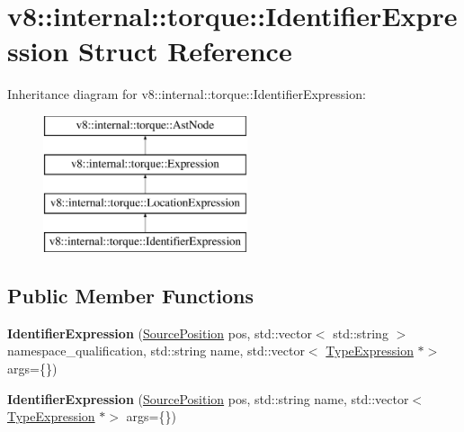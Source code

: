 \hypertarget{structv8_1_1internal_1_1torque_1_1IdentifierExpression}{}\section{v8\+:\+:internal\+:\+:torque\+:\+:Identifier\+Expression Struct Reference}
\label{structv8_1_1internal_1_1torque_1_1IdentifierExpression}
Inheritance diagram for v8\+:\+:internal\+:\+:torque\+:\+:Identifier\+Expression\+:\begin{figure}[H]
\begin{center}
\leavevmode
\includegraphics[height=4.000000cm]{structv8_1_1internal_1_1torque_1_1IdentifierExpression}
\end{center}
\end{figure}
\subsection*{Public Member Functions}
\begin{DoxyCompactItemize}
\item 
\mbox{\label{structv8_1_1internal_1_1torque_1_1IdentifierExpression_ab296ef1b7dcdef04dde3bbd6c00cef46}} 
{\bfseries Identifier\+Expression} (\mbox{\hyperlink{structv8_1_1internal_1_1torque_1_1SourcePosition}{Source\+Position}} pos, std\+::vector$<$ std\+::string $>$ namespace\+\_\+qualification, std\+::string name, std\+::vector$<$ \mbox{\hyperlink{structv8_1_1internal_1_1torque_1_1TypeExpression}{Type\+Expression}} $\ast$$>$ args=\{\})
\item 
\mbox{\label{structv8_1_1internal_1_1torque_1_1IdentifierExpression_a72174bea590f333a4801b1495dca64a7}} 
{\bfseries Identifier\+Expression} (\mbox{\hyperlink{structv8_1_1internal_1_1torque_1_1SourcePosition}{Source\+Position}} pos, std\+::string name, std\+::vector$<$ \mbox{\hyperlink{structv8_1_1internal_1_1torque_1_1TypeExpression}{Type\+Expression}} $\ast$$>$ args=\{\})
\end{DoxyCompactItemize}
